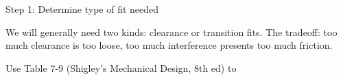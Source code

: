\documentclass[12pt, letterpaper]{report}%
\begin{document}
  Step 1: Determine type of fit needed

  We will generally need two kinds: clearance or transition fits.
  The tradeoff: too much clearance is too loose, too much interference presents too much friction.
  
  
  
  Use Table 7-9 (Shigley's Mechanical Design, 8th ed) to 
\end{document}
